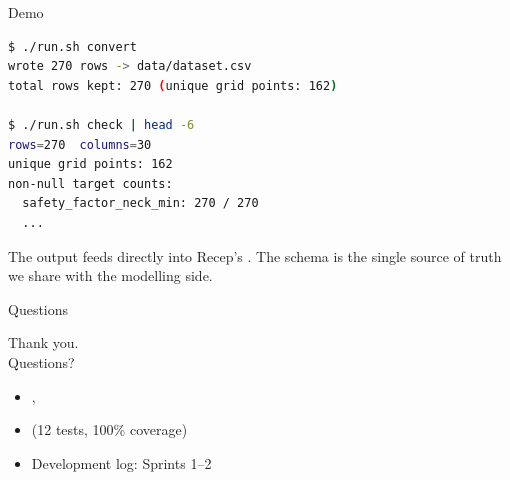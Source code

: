 \begin{frame}[fragile]{Demo}
\begin{lstlisting}[language=bash, basicstyle=\ttfamily\small]
$ ./run.sh convert
wrote 270 rows -> data/dataset.csv
total rows kept: 270 (unique grid points: 162)

$ ./run.sh check | head -6
rows=270  columns=30
unique grid points: 162
non-null target counts:
  safety_factor_neck_min: 270 / 270
  ...
\end{lstlisting}

  \vspace{0.4cm}
  The output feeds directly into Recep's . The schema is
  the \alert{single source of truth} we share with the modelling side.
\end{frame}

\begin{frame}{Questions}
  \vfill
  \begin{center}
    \Large Thank you.\\[0.4cm]
    \normalsize Questions?
  \end{center}
  \vfill
  \scriptsize
  \begin{itemize}
    \item {}, 
    \item {} (12 tests, 100\% coverage)
    \item Development log:  Sprints 1--2
  \end{itemize}
\end{frame}


